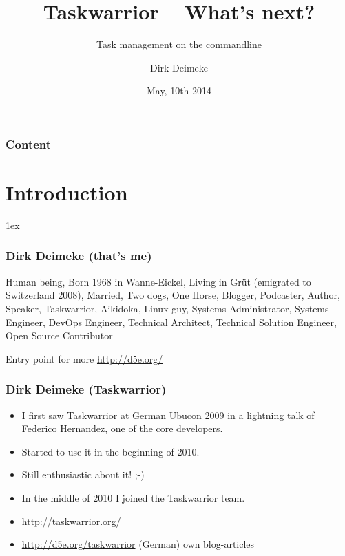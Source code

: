 \documentclass[t,handout]{beamer}
\title{Taskwarrior -- What's next?}
\subtitle{Task management on the commandline}
\author[Deimeke, Dirk]{Dirk Deimeke}
\institute[Swiss Ubuntu Conference 2014]{Ubucon 2014}
\date{May, 10th 2014}
\begin{document}
\begin{frame} %
	\titlepage
\end{frame}


\begin{frame}\frametitle{Content}
	\tableofcontents
\end{frame}

\section{Introduction} 

\parskip1ex

\begin{frame}\frametitle{Dirk Deimeke (that's me)}
	Human being, Born 1968 in Wanne-Eickel, Living in Grüt (emigrated to Switzerland 2008), Married, Two dogs, One Horse, Blogger, Podcaster, Author, Speaker, Taskwarrior, Aikidoka, Linux guy, Systems Administrator, Systems Engineer, DevOps Engineer, Technical Architect, Technical Solution Engineer, Open Source Contributor

	Entry point for more \url{http://d5e.org/}
\end{frame}

\begin{frame}\frametitle{Dirk Deimeke (Taskwarrior)}
\begin{itemize}
	\item I first saw Taskwarrior at German Ubucon 2009 in a lightning talk of Federico Hernandez, one of the core developers. \pause
	\item Started to use it in the beginning of 2010. \pause
	\item Still enthusiastic about it! ;-) \pause
	\item In the middle of 2010 I joined the Taskwarrior team.
	\item \url{http://taskwarrior.org/}
	\item \url{http://d5e.org/taskwarrior} (German) own blog-articles
\end{itemize}
\end{frame}
\end{document}
